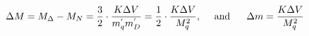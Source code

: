\begin{equation}                              
\Delta M = M_{\Delta} - M_{N} = \frac{3}{2}\cdot \frac{K \Delta V}{m_{q}^{'} m_{D}^{'}} = 
\frac{1}{2} \cdot \frac{K \Delta V}{ M_{q}^{2}},~~~~{\rm and}~~~~~\Delta m = \frac{K \Delta V}{M_{q}^{2}}                              
\end{equation} 

